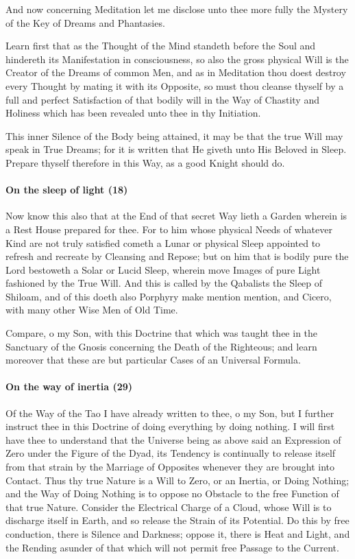 And now concerning Meditation let me disclose unto thee more fully the Mystery of the Key of Dreams and Phantasies.

Learn first that as the Thought of the Mind standeth before the Soul and hindereth its Manifestation in consciousness, so also the gross physical Will is the Creator of the Dreams of common Men, and as in Meditation thou doest destroy every Thought by mating it with its Opposite, so must thou cleanse thyself by a full and perfect Satisfaction of that bodily will in the Way of Chastity and Holiness which has been revealed unto thee in thy Initiation.

This inner Silence of the Body being attained, it may be that the true Will may speak in True Dreams; for it is written that He giveth unto His Beloved in Sleep. Prepare thyself therefore in this Way, as a good Knight should do.

\paragraph{On the sleep of light (18)}


Now know this also that at the End of that secret Way lieth a Garden wherein is a Rest House prepared for thee. For to him whose physical Needs of whatever Kind are not truly satisfied cometh a Lunar or physical Sleep appointed to refresh and recreate by Cleansing and Repose; but on him that is bodily pure the Lord bestoweth a Solar or Lucid Sleep, wherein move Images of pure Light fashioned by the True Will. And this is called by the Qabalists the Sleep of Shiloam, and of this doeth also Porphyry make mention mention, and Cicero, with many other Wise Men of Old Time.

Compare, o my Son, with this Doctrine that which was taught thee in the Sanctuary of the Gnosis concerning the Death of the Righteous; and learn moreover that these are but particular Cases of an Universal Formula.

\paragraph{On the way of inertia (29)}


Of the Way of the Tao I have already written to thee, o my Son, but I further instruct thee in this Doctrine of doing everything by doing nothing. I will first have thee to understand that the Universe being as above said an Expression of Zero under the Figure of the Dyad, its Tendency is continually to release itself from that strain by the Marriage of Opposites whenever they are brought into Contact. Thus thy true Nature is a Will to Zero, or an Inertia, or Doing Nothing; and the Way of Doing Nothing is to oppose no Obstacle to the free Function of that true Nature. Consider the Electrical Charge of a Cloud, whose Will is to discharge itself in Earth, and so release the Strain of its Potential. Do this by free conduction, there is Silence and Darkness; oppose it, there is Heat and Light, and the Rending asunder of that which will not permit free Passage to the Current.

